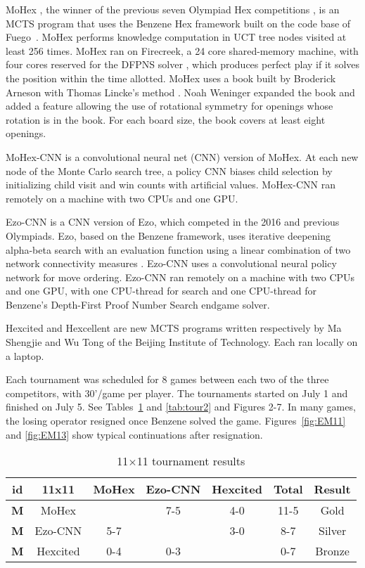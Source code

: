 \documentclass{IOS-Book-Article}
\def\Eo{\mbox{\sc Ezo}}
\def\Ec{\mbox{\sc Ezo-CNN}}
\def\Hite{\mbox{\sc Hexcited}}
\def\Hent{\mbox{\sc Hexcellent}}
\def\Mx{\mbox{\sc MoHex}}
\def\Mc{\mbox{\sc MoHex-CNN}}
\def\Fuego{\mbox{\sc Fuego}}
\begin{document}
\Mx{} \cite{HAHMP13},
the winner of the previous seven Olympiad Hex competitions \cite{HAHP13},
is an MCTS program that uses the Benzene Hex framework
built on the code base of \Fuego\ \cite{fuego}.
\Mx{} performs knowledge computation 
in UCT tree nodes visited at least 256 times.
\Mx{} ran on Firecreek, a 24 core shared-memory machine, 
with four cores reserved for the 
DFPNS solver \cite{PawlH13}, which
produces perfect play if it solves the
position within the time allotted.
\Mx{} uses a book built by Broderick Arneson with Thomas Lincke's method 
\cite{DBLP:conf/cg/Lincke00}. 
Noah Weninger expanded the book and added a feature
allowing the use of rotational symmetry for openings
whose rotation is in the book.
For each board size, the book covers at least eight openings.

\Mc{} is a convolutional neural net (CNN) version of \Mx{}. 
At each new node of the Monte Carlo search tree, 
a policy CNN biases child selection by
initializing child visit and win counts with artificial values.
\Mc{} ran remotely on a machine with two CPUs and one GPU.

\Ec{} is a CNN version of \Eo{}, which competed
in the 2016 and previous Olympiads.
\Eo{}, based on the Benzene framework, 
uses iterative deepening alpha-beta search 
with an evaluation function using a linear combination of
two network connectivity measures \cite{TakadaHIY15}.
\Ec{} uses a convolutional neural policy network
for move ordering.
\Ec{} ran remotely on a machine
with two CPUs and one GPU,
with one CPU-thread for search and one CPU-thread for
Benzene's Depth-First Proof Number Search endgame solver.

\Hite{} and \Hent{} are new MCTS programs written 
respectively by Ma Shengjie and Wu Tong
of the Beijing Institute of Technology.
Each ran locally on a laptop.

Each tournament was scheduled for 8 games between
each two of the three competitors, with 30'/game per player.
The tournaments started on July 1 and finished on July 5.
See Tables~\ref{tab:tour1} and \ref{tab:tour2} and Figures 2-7.
In many games, the losing operator resigned once Benzene solved the game.
Figures~\ref{fig:EM11} and \ref{fig:EM13} show typical continuations
after resignation.

\begin{table}
\begin{tabular}{|c|c|c|c|c|c|c|}
\hline {\bf id} & {\bf 11x11} &\Mx{} &\Ec{}  & \Hite{}  
                & {\bf Total} & {\bf Result} \\ 
\hline {\bf M} & \Mx{}         &      &  7-5  &  4-0   & 11-5  &  Gold \\
\hline {\bf M} & \Ec{}         &  5-7 &       &  3-0   & 8-7   &  Silver \\
\hline {\bf M} & \Hite{}       &  0-4 &  0-3  &        & 0-7   &  Bronze \\
\hline
\end{tabular}
\caption{11$\times$11 tournament results}
\label{tab:tour1}
\end{table}
\end{document}
